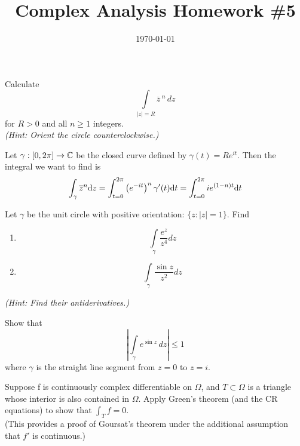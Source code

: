 \documentclass{article}
\date{\today}
\title{Complex Analysis Homework \#5}
\begin{document}
\maketitle

\begin{prob}
Calculate
$$ 
\int\limits_{|z|=R}{\overline z}\,^n \,dz
$$
 for $R>0$ and all $n\geq 1$ integers. \\
 \textit{(Hint: Orient the circle counterclockwise.)}
\end{prob}

Let $\gamma: [0, 2\pi] \rightarrow \mathbb{C}$ be the closed curve defined by $\gamma(t)= R e^{it}$. Then the integral we want to find is
\[ \int_\gamma \overline{z}^n \mathrm{d} z = \int_{t=0}^{2\pi} \left( e^{-it} \right)^n \gamma'(t) \mathrm{d} t = \int_{t=0}^{2\pi} i e^{(1-n)t} \mathrm{d} t \]


\begin{prob}
 Let $\gamma$ be the unit circle with positive orientation: $\{z : |z|=1\}$. Find
\begin{enumerate} 
\item
 \[ 
 \int\limits_{\gamma} \frac{e^{z}}{z^4} dz 
 \]
\item
 \[ 
 \int\limits_{\gamma} \frac{\sin z} {z^2} dz
 \] 
\end{enumerate}
\textit{(Hint: Find their antiderivatives.)}
\end{prob}

\begin{prob}
Show that $$\left |\int\limits_\gamma e^{\sin z}\, dz\right |\leq 1$$ where
$\gamma$ is the straight line segment from $z=0$ to $z=i$.
\end{prob}

\begin{prob}
    Suppose f is continuously complex differentiable on $\Omega$, and $T \subset \Omega$ is a triangle whose interior is also contained in $\Omega$. Apply Green’s theorem (and the CR equations) to show that $\int_T f=0$. \\
(This provides a proof of Goursat’s theorem under the additional assumption that $f'$ is continuous.)
\end{prob}
\end{document}
